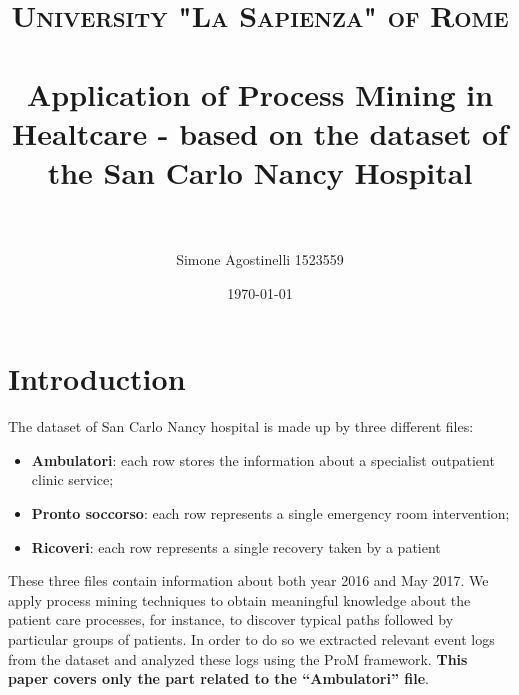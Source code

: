 \documentclass[paper=a4, fontsize=11pt]{scrartcl} %
\title{	
\normalfont \normalsize 
\textsc{University "La Sapienza" of Rome} \\ [25pt] %
\horrule{0.5pt} \\[0.4cm] %
\huge Application of Process Mining in Healtcare - based on the dataset of the San Carlo Nancy Hospital\\ %
\horrule{2pt} \\[0.5cm] %
}
\author{Simone Agostinelli 1523559} %
\date{\normalsize\today} %
\numberwithin{equation}{section} %
\numberwithin{figure}{section} %
\numberwithin{table}{section} %
\begin{document}
\maketitle %
\tableofcontents
\clearpage
\section{Introduction}
The dataset of San Carlo Nancy hospital is made up by three different files:
\begin{itemize}
\item \textbf{Ambulatori}: each row stores the information about a specialist outpatient clinic service;
\item \textbf{Pronto soccorso}: each row represents a single emergency room intervention;
\item \textbf{Ricoveri}: each row represents a single recovery taken by a patient
\end{itemize}
These three files contain information about both year 2016 and May 2017. We apply process mining techniques to obtain meaningful knowledge about the patient care processes, for instance, to discover typical paths followed by particular groups of patients. In order to do so we extracted relevant event logs from the dataset and analyzed these logs using the ProM framework. \textbf{This paper covers only the part related to the ``Ambulatori'' file}.
\newpage
\end{document}
